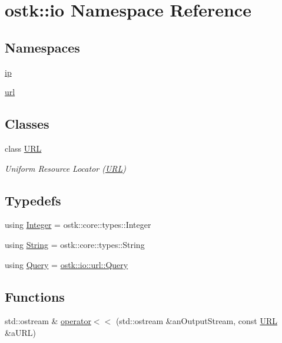 \hypertarget{namespaceostk_1_1io}{}\section{ostk\+:\+:io Namespace Reference}
\label{namespaceostk_1_1io}
\subsection*{Namespaces}
\begin{DoxyCompactItemize}
\item 
 \hyperlink{namespaceostk_1_1io_1_1ip}{ip}
\item 
 \hyperlink{namespaceostk_1_1io_1_1url}{url}
\end{DoxyCompactItemize}
\subsection*{Classes}
\begin{DoxyCompactItemize}
\item 
class \hyperlink{classostk_1_1io_1_1_u_r_l}{U\+RL}
\begin{DoxyCompactList}\small\item\em Uniform Resource Locator (\hyperlink{classostk_1_1io_1_1_u_r_l}{U\+RL}) \end{DoxyCompactList}\end{DoxyCompactItemize}
\subsection*{Typedefs}
\begin{DoxyCompactItemize}
\item 
using \hyperlink{namespaceostk_1_1io_a35328f680550d000b2754860bbe1d268}{Integer} = ostk\+::core\+::types\+::\+Integer
\item 
using \hyperlink{namespaceostk_1_1io_a95d49b120613a7610cb1b4f03b1116b6}{String} = ostk\+::core\+::types\+::\+String
\item 
using \hyperlink{namespaceostk_1_1io_aeabc644ba5c25896df8014bd0271f970}{Query} = \hyperlink{classostk_1_1io_1_1url_1_1_query}{ostk\+::io\+::url\+::\+Query}
\end{DoxyCompactItemize}
\subsection*{Functions}
\begin{DoxyCompactItemize}
\item 
std\+::ostream \& \hyperlink{namespaceostk_1_1io_a72e6c8096e4cae52cdd226a664f1b498}{operator$<$$<$} (std\+::ostream \&an\+Output\+Stream, const \hyperlink{classostk_1_1io_1_1_u_r_l}{U\+RL} \&a\+U\+RL)
\end{DoxyCompactItemize}


